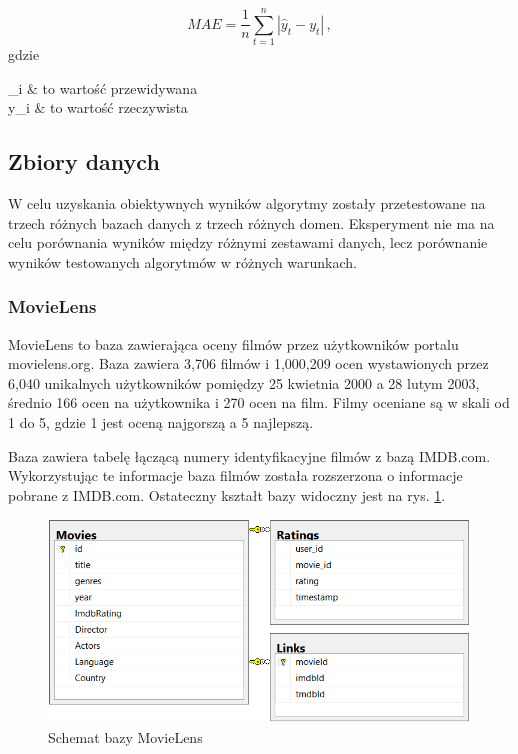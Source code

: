 \documentclass[twoside]{iisthesis}
\begin{document}
		\begin{equation}
		\label{eq:mae}
		MAE = \frac{1}{n} \sum_{t=1}^{n} |\hat{y}_t - y_t|
		\,,
		\end{equation}		
		gdzie
		
		\begin{conditions*}
			_i & to wartość przewidywana \\
			y_i  &  to wartość rzeczywista
		\end{conditions*} 
	
	
		\subsection{Zbiory danych}
		
		W celu uzyskania obiektywnych wyników algorytmy zostały przetestowane na trzech różnych bazach danych z trzech różnych domen. Eksperyment nie ma na celu porównania wyników między różnymi zestawami danych, lecz porównanie wyników testowanych algorytmów w różnych warunkach. 
		
		\subsubsection{MovieLens}
		MovieLens \cite{harper2016movielens} to baza zawierająca oceny filmów przez użytkowników portalu movielens.org. Baza zawiera 3,706 filmów i 1,000,209 ocen wystawionych przez 6,040 unikalnych użytkowników pomiędzy 25 kwietnia 2000 a 28 lutym 2003, średnio 166 ocen na użytkownika i 270 ocen na film. Filmy oceniane są w skali od 1 do 5, gdzie 1 jest oceną najgorszą a 5 najlepszą. 
		
		Baza zawiera tabelę łączącą numery identyfikacyjne filmów z bazą IMDB.com. Wykorzystując te informacje baza filmów została rozszerzona o informacje pobrane z IMDB.com. Ostateczny kształt bazy widoczny jest na rys. \ref{fig:movielens_schema}.
		
			\begin{figure}[!ht] 
				\centering
				\includegraphics[width=1\textwidth]{movielens}
				\caption{Schemat bazy MovieLens}
				\label{fig:movielens_schema}
			\end{figure}
		
\end{document}
